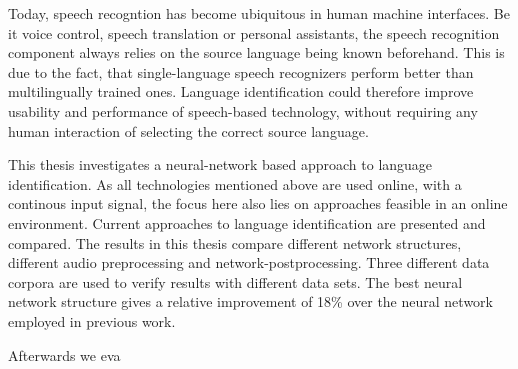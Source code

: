 
\Abstract
Today, speech recogntion has become ubiquitous in human machine interfaces. Be it voice control, speech translation or personal assistants, the speech recognition component always relies on the source language being known beforehand. This is due to the fact, that single-language speech recognizers perform better than multilingually trained ones. Language identification could therefore improve usability and performance of speech-based technology, without requiring any human interaction of selecting the correct source language. 

This thesis investigates a neural-network based approach to language identification. As all technologies mentioned above are used online, with a continous input signal, the focus here also lies on approaches feasible in an online environment. Current approaches to language identification are presented and compared. The results in this thesis compare different network structures, different audio preprocessing and network-postprocessing. Three different data corpora are used to verify results with different data sets. The best neural network structure gives a relative improvement of 18\% over the neural network employed in previous work.

Afterwards we eva

